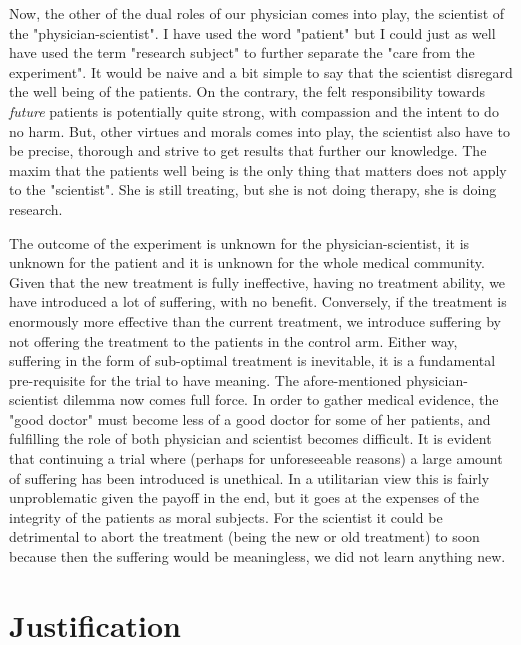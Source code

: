 \documentclass[12p]{article}
\begin{document}
Now, the other of the dual roles of our physician comes into play, the scientist of the "physician-scientist".
I have used the word "patient" but I could just as well have used the term "research subject" to further separate the "care from the experiment".
It would be naive and a bit simple to say that the scientist disregard the well being of the patients.
On the contrary, the felt responsibility towards \emph{future} patients is potentially quite strong, with compassion and the intent to do no harm.
But, other virtues and morals comes into play, the scientist also have to be precise, thorough and strive to get results that further our knowledge.
The maxim that the patients well being is the only thing that matters does not apply to the "scientist".
She is still treating, but she is not doing therapy, she is doing research.

The outcome of the experiment is unknown for the physician-scientist, it is unknown for the patient and it is unknown for the whole medical community.
Given that the new treatment is fully ineffective, having no treatment ability, we have introduced a lot of suffering, with no benefit.
Conversely, if the treatment is enormously more effective than the current treatment, we introduce suffering by not offering the treatment to the patients in the control arm.
Either way, suffering in the form of sub-optimal treatment is inevitable, it is a fundamental pre-requisite for the trial to have meaning.
The afore-mentioned physician-scientist dilemma now comes full force.
In order to gather medical evidence, the "good doctor" must become less of a good doctor for some of her patients, and fulfilling the role of both physician and scientist becomes difficult.
It is evident that continuing a trial where (perhaps for unforeseeable reasons) a large amount of suffering has been introduced is unethical.
In a utilitarian view this is fairly unproblematic given the payoff in the end, but it goes at the expenses of the integrity of the patients as moral subjects.
For the scientist it could be detrimental to abort the treatment (being the new or old treatment) to soon because then the suffering would be meaningless, we did not learn anything new.

\section{Justification}
\end{document}
